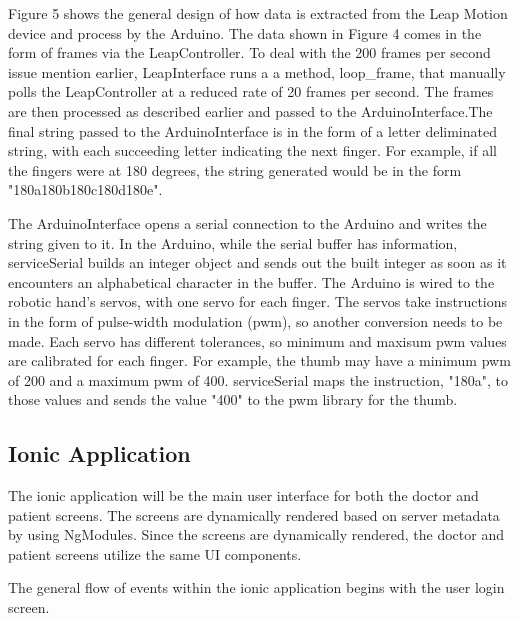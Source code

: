 \documentclass[a4paper,10pt]{article}
\begin{document}
            Figure 5 shows the general design of how data is extracted from the Leap Motion device and process by the Arduino. The data shown in Figure 4 comes in the form of frames via the LeapController. To deal with the 200 frames per second issue mention earlier, LeapInterface runs a a method, loop\_frame, that manually polls the LeapController at a reduced rate of 20 frames per second. The frames are then processed as described earlier and passed to the ArduinoInterface.The final string passed to the ArduinoInterface is in the form of a letter deliminated string, with each succeeding letter indicating the next finger. For example, if all the fingers were at 180 degrees, the string generated would be in the form "180a180b180c180d180e".

            The ArduinoInterface opens a serial connection to the Arduino and writes the string given to it. In the Arduino, while the serial buffer has information, serviceSerial builds an integer object and sends out the built integer as soon as it encounters an alphabetical character in the buffer. The Arduino is wired to the robotic hand's servos, with one servo for each finger. The servos take instructions in the form of pulse-width modulation (pwm), so another conversion needs to be made. Each servo has different tolerances, so minimum and maxisum pwm values are calibrated for each finger. For example, the thumb may have a minimum pwm of 200 and a maximum pwm of 400. serviceSerial maps the instruction, "180a", to those values and sends the value "400" to the pwm library for the thumb.
            
        \subsection{Ionic Application}
            The ionic application will be the main user interface for both the doctor and patient screens. The screens are dynamically rendered based on server metadata by using NgModules. Since the screens are dynamically rendered, the doctor and patient screens utilize the same UI components.
            
            
            The general flow of events within the ionic application begins with the user login screen. 
            
\end{document}
